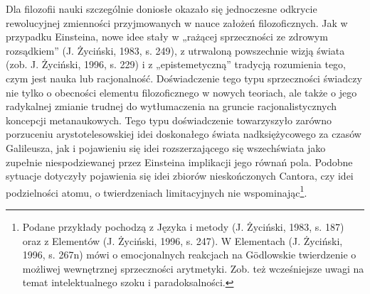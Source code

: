 \documentclass{article}
\begin{document}
Dla filozofii nauki szczególnie doniosłe okazało się jednoczesne odkrycie rewolucyjnej zmienności przyjmowanych w nauce
założeń filozoficznych. Jak w przypadku Einsteina, nowe idee stały w „rażącej sprzeczności ze zdrowym rozsądkiem”
\label{ref:RND5BoFYxeq4l}(J. Życiński, 1983, s. 249), z utrwaloną powszechnie wizją świata
\label{ref:RND3mHQnO08gW}(zob. J. Życiński, 1996, s. 229) i z „epistemetyczną” tradycją rozumienia tego, czym jest
nauka lub racjonalność.  Doświadczenie tego typu sprzeczności świadczy nie tylko o obecności elementu filozoficznego w
nowych teoriach, ale także o jego radykalnej zmianie trudnej do wytłumaczenia na gruncie racjonalistycznych koncepcji
metanaukowych. Tego typu doświadczenie towarzyszyło zarówno porzuceniu arystotelesowskiej idei doskonałego świata
nadksiężycowego za czasów Galileusza, jak i pojawieniu się idei rozszerzającego się wszechświata jako zupełnie
niespodziewanej przez Einsteina implikacji jego równań pola. Podobne sytuacje dotyczyły pojawienia się idei zbiorów
nieskończonych Cantora, czy idei podzielności atomu, o twierdzeniach limitacyjnych nie wspominając\footnote{Podane
przykłady pochodzą z Języka i metody \label{ref:RNDrtmG57I1dG}(J. Życiński, 1983, s. 187) oraz z Elementów
\label{ref:RNDorQuglTydR}(J. Życiński, 1996, s. 247). W Elementach \label{ref:RNDYo0f9hcHkW}(J. Życiński, 1996, s.
267n) mówi o emocjonalnych reakcjach na Gödlowskie twierdzenie o możliwej wewnętrznej sprzeczności arytmetyki. Zob. też
wcześniejsze uwagi na temat intelektualnego szoku i paradoksalności. }.
\end{document}
